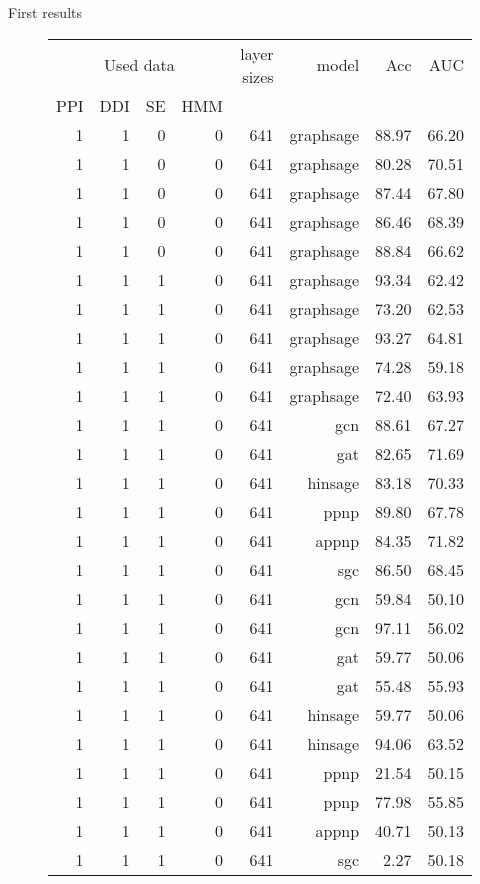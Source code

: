 \documentclass[10pt]{beamer}
\begin{document}
\begin{frame}{First results}
	\begin{figure}
		\centering
		\begingroup
		
		\footnotesize
		\def\arraystretch{1.2}
		\begin{tabular}{|r|r|r|r|r|r|r|r|}
			\hline
			\multicolumn{4}{|c|}{Used data}&layer sizes&model&Acc&AUC\\
			PPI&DDI&SE&HMM&&&&\\
			\hline
			1&1&0&0&641&graphsage&88.97&66.20\\
			1&1&0&0&641&graphsage&80.28&70.51\\
			1&1&0&0&641&graphsage&87.44&67.80\\
			1&1&0&0&641&graphsage&86.46&68.39\\
			1&1&0&0&641&graphsage&88.84&66.62\\
			1&1&1&0&641&graphsage&93.34&62.42\\
			1&1&1&0&641&graphsage&73.20&62.53\\
			1&1&1&0&641&graphsage&93.27&64.81\\
			1&1&1&0&641&graphsage&74.28&59.18\\
			1&1&1&0&641&graphsage&72.40&63.93\\
			1&1&1&0&641&gcn&88.61&67.27\\
			1&1&1&0&641&gat&82.65&71.69\\
			1&1&1&0&641&hinsage&83.18&70.33\\
			1&1&1&0&641&ppnp&89.80&67.78\\
			1&1&1&0&641&appnp&84.35&71.82\\
			1&1&1&0&641&sgc&86.50&68.45\\
			1&1&1&0&641&gcn&59.84&50.10\\
			1&1&1&0&641&gcn&97.11&56.02\\
			1&1&1&0&641&gat&59.77&50.06\\
			1&1&1&0&641&gat&55.48&55.93\\
			1&1&1&0&641&hinsage&59.77&50.06\\
			1&1&1&0&641&hinsage&94.06&63.52\\
			1&1&1&0&641&ppnp&21.54&50.15\\
			1&1&1&0&641&ppnp&77.98&55.85\\
			1&1&1&0&641&appnp&40.71&50.13\\
			1&1&1&0&641&sgc&2.27&50.18\\
			\hline  
		\end{tabular}
		\endgroup
	\end{figure}
\end{frame}
\end{document}
